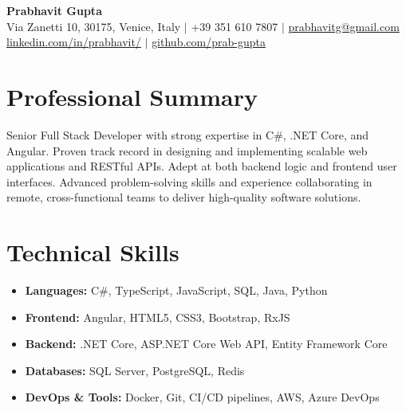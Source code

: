 \documentclass[11pt,a4paper]{article}
\begin{document}
\begin{center}
    {\Huge \textbf{Prabhavit Gupta}} \\
    \vspace{2mm}
    Via Zanetti 10, 30175, Venice, Italy $\vert$ +39 351 610 7807 $\vert$ \href{mailto:prabhavitg@gmail.com}{prabhavitg@gmail.com} \\
    \href{https://www.linkedin.com/in/prabhavit/}{linkedin.com/in/prabhavit/} $\vert$ \href{https://github.com/prab-gupta}{github.com/prab-gupta}
\end{center}

\vspace{5mm}
\section*{Professional Summary}
Senior Full Stack Developer with strong expertise in C\#, .NET Core, and Angular. Proven track record in designing and implementing scalable web applications and RESTful APIs. Adept at both backend logic and frontend user interfaces. Advanced problem-solving skills and experience collaborating in remote, cross-functional teams to deliver high-quality software solutions.

\section*{Technical Skills}
\begin{itemize}[leftmargin=*]
    \item \textbf{Languages:} C\#, TypeScript, JavaScript, SQL, Java, Python
    \item \textbf{Frontend:} Angular, HTML5, CSS3, Bootstrap, RxJS
    \item \textbf{Backend:} .NET Core, ASP.NET Core Web API, Entity Framework Core
    \item \textbf{Databases:} SQL Server, PostgreSQL, Redis
    \item \textbf{DevOps \& Tools:} Docker, Git, CI/CD pipelines, AWS, Azure DevOps
\end{itemize}
\end{document}
